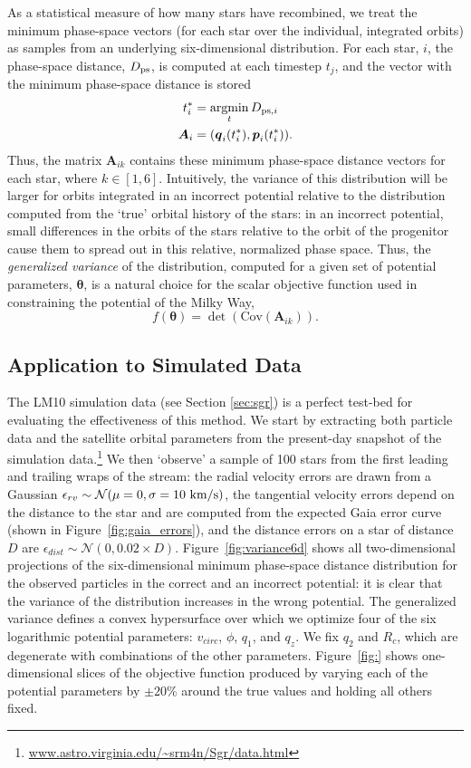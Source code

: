 \documentclass[preprint]{aastex}
\newcommand{\bs}{\boldsymbol}
\newcommand{\argmin}{\operatornamewithlimits{argmin}}
\begin{document}
As a statistical measure of how many stars have recombined, we
treat the minimum phase-space vectors (for
each star over the individual, integrated orbits) as samples from an underlying six-dimensional distribution. For each star, $i$,
the phase-space distance, $D_{\rm ps}$, is computed at each timestep
$t_{j}$, and the vector with the minimum phase-space distance is stored
\begin{align}
  t^*_{i} &= \argmin_{t} D_{{\rm ps},i}\\
  \bs{A}_{i} &= (\bs{q}_{i}(t^*_{i}),\bs{p}_{i}(t^*_{i})).
\end{align}
Thus, the matrix $\bs{A}_{ik}$ contains these minimum phase-space distance vectors for each star,
where $k\in[1,6]$. Intuitively, the variance of this distribution
will be larger for orbits integrated in an incorrect potential
relative to the distribution computed from the `true' orbital history
of the stars: in an incorrect potential, small differences in the
orbits of the stars relative to the orbit of the progenitor cause them
to spread out in this relative, normalized phase space. Thus, the
\emph{generalized variance} of the distribution, computed for a given
set of potential parameters, $\bs{\theta}$, is a natural choice for
the scalar objective function used in constraining the potential of
the Milky Way,
\begin{equation}
  f(\bs{\theta})=\det(\mathrm{Cov}( \bs{A}_{ik})).
\end{equation}

\subsection{Application to Simulated Data}
The LM10 simulation data (see Section \ref{sec:sgr}) is a perfect
test-bed for evaluating the effectiveness of this method. We start by
extracting both particle data and the satellite orbital parameters
from the present-day snapshot of the simulation
data.\footnote{\url{www.astro.virginia.edu/~srm4n/Sgr/data.html}} We then
`observe' a sample of 100 stars from the first leading and trailing
wraps of the stream: the radial velocity errors are drawn from a
Gaussian $\epsilon_{rv} \sim \mathcal{N}(\mu=0,\sigma=10~{\rm km/s})$,
the tangential velocity errors depend on the distance to the star and
are computed from the expected Gaia error curve (shown in
Figure~\ref{fig:gaia_errors}), and the distance errors on a star of distance
$D$ are $\epsilon_{dist} \sim \mathcal{N}(0,0.02\times
D)$. Figure~\ref{fig:variance6d} shows all two-dimensional projections of the six-dimensional minimum
phase-space distance distribution for the observed particles in the
correct and an incorrect potential: it is clear that the
variance of the distribution increases in the wrong potential. The 
generalized variance defines a convex hypersurface over which we
optimize four of the six logarithmic potential parameters:
$v_{circ}$, $\phi$, $q_1$, and $q_z$. We fix $q_2$ and $R_c$, which are degenerate with combinations of the other parameters. Figure~\ref{fig:} shows one-dimensional slices of the objective function
produced by varying each of the potential parameters by
$\pm20\%$ around the true values and holding all others fixed.
\end{document}
